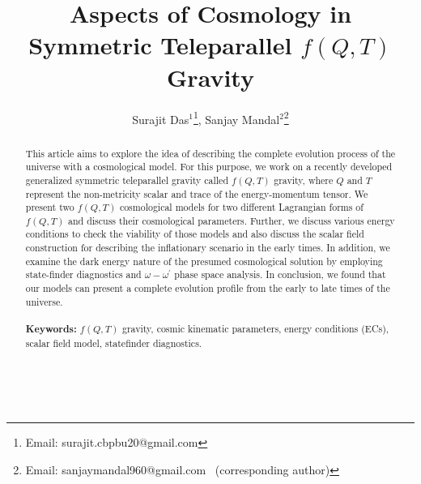 \documentclass[showpacs,aps,amssymb,preprintnumbers,prd,amsmath,floatfix]{revtex4}
\def \o{\omega}
\begin{document}
	
%

\title{Aspects of Cosmology in Symmetric Teleparallel $f(Q,T)$ Gravity}

\author{Surajit Das$^{1}$\footnote{Email: surajit.cbpbu20@gmail.com},
  Sanjay Mandal$^{2}$\footnote{Email: sanjaymandal960@gmail.com
  ~(corresponding author)}}\
  



\begin{abstract}
This article aims to explore the idea of describing the complete evolution process of the universe with a cosmological model. For this purpose, we work on a recently developed generalized symmetric teleparallel gravity called $f(Q,T)$ gravity, where $Q$ and $T$ represent the non-metricity scalar and trace of the energy-momentum tensor. We present two $f(Q,T)$ cosmological models for two different Lagrangian forms of $f(Q,T)$ and discuss their cosmological parameters. Further, we discuss various energy conditions to check the viability of those models and also discuss the scalar field construction for describing the inflationary scenario in the early times. In addition, we examine the dark energy nature of the presumed cosmological solution by employing state-finder diagnostics and $\o-\o^{\prime}$ phase space analysis. In conclusion, we found that our models can present a complete evolution profile from the early to late times of the universe.
\\ \\
\textbf{Keywords:} $f(Q,T)$ gravity, cosmic kinematic parameters, energy conditions (ECs), scalar field model, statefinder diagnostics.
\end{abstract}





\maketitle
\end{document}
